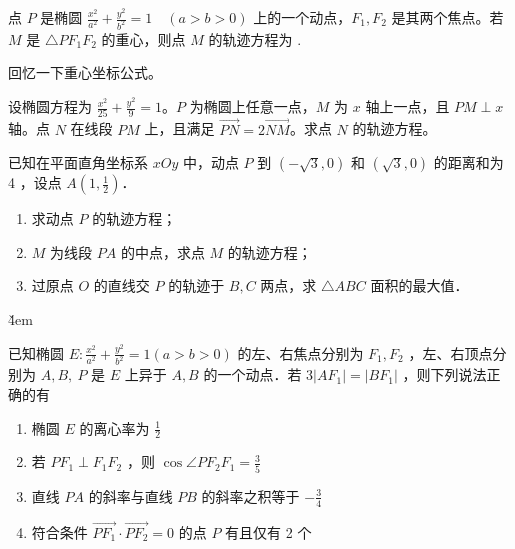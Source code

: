\newpage{}

\begin{example}
    点 $P$ 是椭圆 $\frac{x^2}{a^2} + \frac{y^2}{b^2} = 1 \quad (a>b>0)$ 上的一个动点，$F_1, F_2$ 是其两个焦点。若 $M$ 是 $\triangle PF_1F_2$ 的重心，则点 $M$ 的轨迹方程为 \underline{\hspace{4cm}}.
\end{example}

\begin{tips}
    回忆一下重心坐标公式。
\end{tips}

\vspace{6em}

\begin{example}
    设椭圆方程为 $\frac{x^2}{25} + \frac{y^2}{9} = 1$。$P$ 为椭圆上任意一点，$M$ 为 $x$ 轴上一点，且 $PM \perp x$ 轴。点 $N$ 在线段 $PM$ 上，且满足 $\overrightarrow{PN} = 2\overrightarrow{NM}$。求点 $N$ 的轨迹方程。
\end{example}

\vspace{6em}



\begin{problem}
已知在平面直角坐标系 $x O y$ 中，动点 $P$ 到 $(-\sqrt{3}, 0)$ 和 $(\sqrt{3}, 0)$ 的距离和为 4 ，设点 $A\left(1, \frac{1}{2}\right)$．
\begin{enumerate}
    \item 求动点 $P$ 的轨迹方程；
    \item $M$ 为线段 $P A$ 的中点，求点 $M$ 的轨迹方程；
    \item 过原点 $O$ 的直线交 $P$ 的轨迹于 $B, C$ 两点，求 $\triangle A B C$ 面积的最大值．
\end{enumerate}
\end{problem}

\v{4em}

\begin{problem}
已知椭圆 $E: \frac{x^2}{a^2}+\frac{y^2}{b^2}=1(a>b>0)$ 的左、右焦点分别为 $F_1, F_2$ ，左、右顶点分别为 $A, B, ~ P$ 是 $E$ 上异于 $A, B$ 的一个动点．若 $3\left|A F_1\right|=\left|B F_1\right|$ ，则下列说法正确的有
\begin{enumerate}
    \item 椭圆 $E$ 的离心率为 $\frac{1}{2}$
    \item 若 $P F_1 \perp F_1 F_2$ ，则 $\cos \angle P F_2 F_1=\frac{3}{5}$
    \item 直线 $P A$ 的斜率与直线 $P B$ 的斜率之积等于 $-\frac{3}{4}$
    \item 符合条件 $\overrightarrow{P F_1} \cdot \overrightarrow{P F_2}=0$ 的点 $P$ 有且仅有 2 个
\end{enumerate}
\end{problem}

